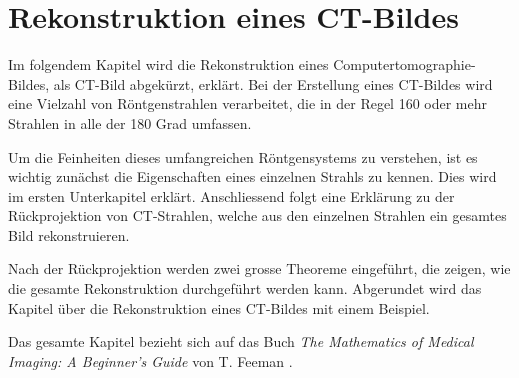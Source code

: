 %
%
%
%
\chapter{Rekonstruktion eines CT-Bildes \label{chapter:ct}}
\begin{refsection}

Im folgendem Kapitel wird die Rekonstruktion eines Computertomographie-Bildes, als CT-Bild abgekürzt, erklärt. 
Bei der Erstellung eines CT-Bildes wird eine Vielzahl von Röntgenstrahlen verarbeitet, die in der Regel 160 oder mehr Strahlen in alle der 180 Grad umfassen. 

Um die Feinheiten dieses umfangreichen Röntgensystems zu verstehen, ist es wichtig zunächst die Eigenschaften eines einzelnen Strahls zu kennen. Dies wird im ersten Unterkapitel erklärt. 
Anschliessend folgt eine Erklärung zu der Rückprojektion von CT-Strahlen, welche aus den einzelnen Strahlen ein gesamtes Bild rekonstruieren. 

Nach der Rückprojektion werden zwei grosse Theoreme eingeführt, die zeigen, wie die gesamte Rekonstruktion durchgeführt werden kann. Abgerundet wird das Kapitel über die Rekonstruktion eines CT-Bildes mit einem Beispiel.

Das gesamte Kapitel bezieht sich auf das Buch \emph{The Mathematics of Medical Imaging: A Beginner's Guide} von T. Feeman \cite{feeman_mathematics_2015}.






\printbibliography[heading=subbibliography]
\end{refsection}

